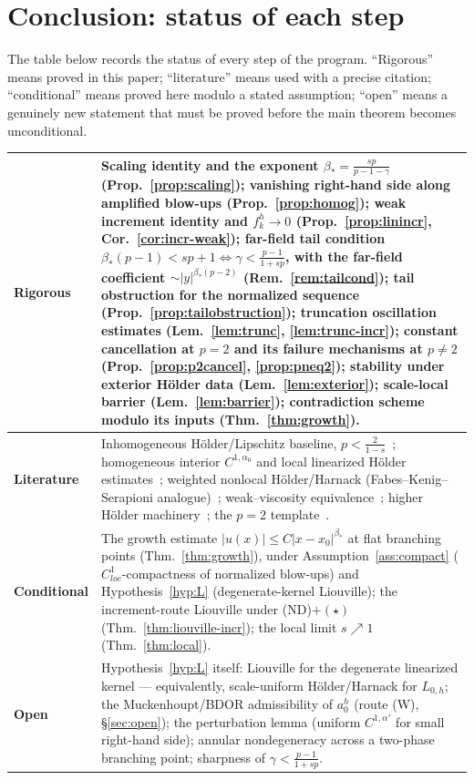 \documentclass[11pt]{amsart}
\theoremstyle{plain}
\theoremstyle{definition}
\theoremstyle{remark}
\newcommand{\al}{\alpha}
\begin{document}
\section{Conclusion: status of each step}\label{sec:conclusion}
The table below records the status of every step of the program. ``Rigorous''
means proved in this paper; ``literature'' means used with a precise citation;
``conditional'' means proved here modulo a stated assumption; ``open'' means a
genuinely new statement that must be proved before the main theorem becomes
unconditional.

\begin{center}
\renewcommand{\arraystretch}{1.35}
\begin{tabular}{|p{}|p{}|}
\hline
\textbf{Rigorous} &
Scaling identity and the exponent $\beta_*=\frac{sp}{p-1-\gamma}$
(Prop.~\ref{prop:scaling}); vanishing right-hand side along amplified
blow-ups (Prop.~\ref{prop:homog}); weak increment identity and
$f_k^h\to0$ (Prop.~\ref{prop:linincr}, Cor.~\ref{cor:incr-weak}); far-field
tail condition $\beta_*(p-1)<sp+1\iff\gamma<\frac{p-1}{1+sp}$, with the
far-field coefficient $\sim|y|^{\beta_*(p-2)}$
(Rem.~\ref{rem:tailcond}); tail obstruction for the normalized sequence
(Prop.~\ref{prop:tailobstruction}); truncation oscillation estimates
(Lem.~\ref{lem:trunc}, \ref{lem:trunc-incr}); constant cancellation at
$p=2$ and its failure mechanisms at $p\neq2$
(Prop.~\ref{prop:p2cancel}, \ref{prop:pneq2}); stability under exterior
H\"older data (Lem.~\ref{lem:exterior}); scale-local barrier
(Lem.~\ref{lem:barrier}); contradiction scheme modulo its inputs
(Thm.~\ref{thm:growth}). \\
\hline
\textbf{Literature} &
Inhomogeneous H\"older/Lipschitz baseline, $p<\frac2{1-s}$~\cite{BT};
homogeneous interior $C^{1,\al_0}$ and local linearized H\"older
estimates~\cite{GJS}; weighted nonlocal
H\"older/Harnack (Fabes--Kenig--Serapioni analogue)~\cite{BDOR};
weak--viscosity equivalence~\cite{KKL}; higher H\"older
machinery~\cite{BLS}; the $p=2$ template~\cite{PTU}. \\
\hline
\textbf{Conditional} &
The growth estimate $|u(x)|\le C|x-x_0|^{\beta_*}$ at flat branching points
(Thm.~\ref{thm:growth}), under Assumption~\ref{ass:compact}
($C^1_{loc}$-compactness of normalized blow-ups) and
Hypothesis~\ref{hyp:L} (degenerate-kernel Liouville); the increment-route
Liouville under \textnormal{(ND)}$+(\star)$
(Thm.~\ref{thm:liouville-incr}); the local limit $s\nearrow1$
(Thm.~\ref{thm:local}). \\
\hline
\textbf{Open} &
Hypothesis~\ref{hyp:L} itself: Liouville for the degenerate linearized
kernel --- equivalently, scale-uniform H\"older/Harnack for $L_{0,h}$; the
Muckenhoupt/BDOR admissibility of $a_0^h$ (route (W), \S\ref{sec:open});
the perturbation lemma (uniform $C^{1,\al'}$ for small right-hand side);
annular nondegeneracy across a two-phase branching point; sharpness of
$\gamma<\frac{p-1}{1+sp}$. \\
\hline
\end{tabular}
\end{center}
\end{document}
